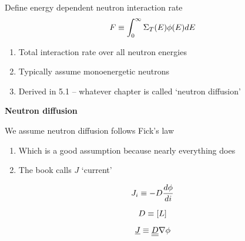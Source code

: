 \documentclass[aspectratio=1610,pdftex,dvipsnames,compress,xcolor={dvipsnames}]{beamer}
\begin{document}
\addtocounter{framenumber}{-1} 
\begin{frame}{Define energy dependent neutron interaction rate}
    \begin{equation}
        \LARGE
        F \equiv \int^\infty_0 \Sigma_T(E) \phi(E) dE
    \end{equation}

    \vspace*{\fill}

    \begin{enumerate}[series=outerlist,topsep=0pt,itemsep=21pt,leftmargin=*,label=(\arabic*)]
        \item[]Total interaction rate over all neutron energies
        \item[]Typically assume monoenergetic neutrons
        \item[]Derived in 5.1 -- whatever chapter is called `neutron diffusion'
    \end{enumerate}
\end{frame}


\begin{frame}[plain]{}
    \centering\LARGE\textbf{Neutron diffusion}
\end{frame}


\addtocounter{framenumber}{-1} 
\begin{frame}{We assume neutron diffusion follows Fick's law}
    \begin{enumerate}[series=outerlist,topsep=0pt,itemsep=21pt,leftmargin=*,label=(\arabic*)]
        \item[]Which is a good assumption because nearly everything does
        \item[]The book calls $J$ `current' 
    \end{enumerate}

    \vspace*{\fill}

    \begin{equation}
        \LARGE
        J_i \equiv -D \frac{d \phi}{di}
    \end{equation}

    \begin{equation}
        \LARGE
        D \equiv [L]
    \end{equation}

    \begin{equation}
        \LARGE
        \underline{J} \equiv \underline{\underline{D}} \nabla \phi
    \end{equation}
\end{frame}
\end{document}
